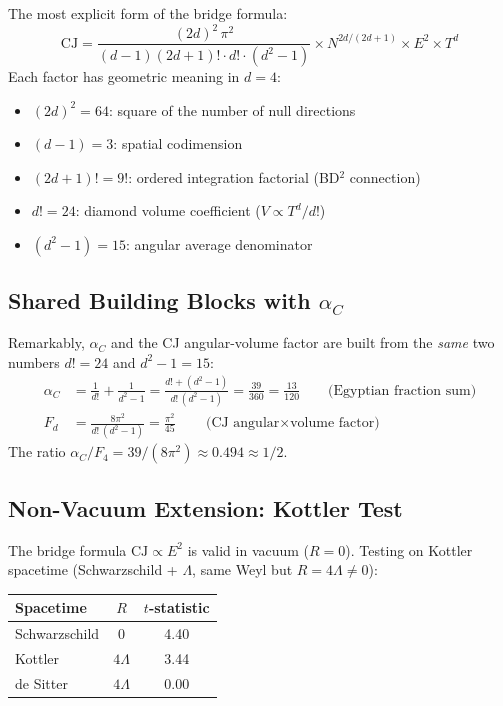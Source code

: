 \documentclass[11pt,a4paper]{article}
\begin{document}
The most explicit form of the bridge formula:
\begin{equation}
\text{CJ} = \frac{(2d)^2\,\pi^2}{(d{-}1)(2d{+}1)!\cdot d!\cdot(d^2{-}1)} \times N^{2d/(2d+1)} \times E^2 \times T^d
\end{equation}
Each factor has geometric meaning in $d = 4$:
\begin{itemize}
\item $(2d)^2 = 64$: square of the number of null directions
\item $(d{-}1) = 3$: spatial codimension
\item $(2d{+}1)! = 9!$: ordered integration factorial (BD$^2$ connection)
\item $d! = 24$: diamond volume coefficient ($V \propto T^d/d!$)
\item $(d^2{-}1) = 15$: angular average denominator
\end{itemize}

\subsection{Shared Building Blocks with $\alpha_C$}

Remarkably, $\alpha_C$ and the CJ angular-volume factor are built from the \emph{same} two numbers $d! = 24$ and $d^2{-}1 = 15$:
\begin{align}
\alpha_C &= \frac{1}{d!} + \frac{1}{d^2{-}1} = \frac{d! + (d^2{-}1)}{d!\,(d^2{-}1)} = \frac{39}{360} = \frac{13}{120} \qquad \text{(Egyptian fraction sum)} \\
F_d &= \frac{8\pi^2}{d!\,(d^2{-}1)} = \frac{\pi^2}{45} \qquad \text{(CJ angular$\times$volume factor)}
\end{align}
The ratio $\alpha_C / F_4 = 39/(8\pi^2) \approx 0.494 \approx 1/2$.

\subsection{Non-Vacuum Extension: Kottler Test}

The bridge formula $\text{CJ} \propto E^2$ is valid in vacuum ($R = 0$). Testing on Kottler spacetime (Schwarzschild + $\Lambda$, same Weyl but $R = 4\Lambda \neq 0$):

\begin{center}
\begin{tabular}{lcc}
\toprule
Spacetime & $R$ & $t$-statistic \\
\midrule
Schwarzschild & 0 & 4.40 \\
Kottler & $4\Lambda$ & 3.44 \\
de Sitter & $4\Lambda$ & 0.00 \\
\bottomrule
\end{tabular}
\end{center}
\end{document}
